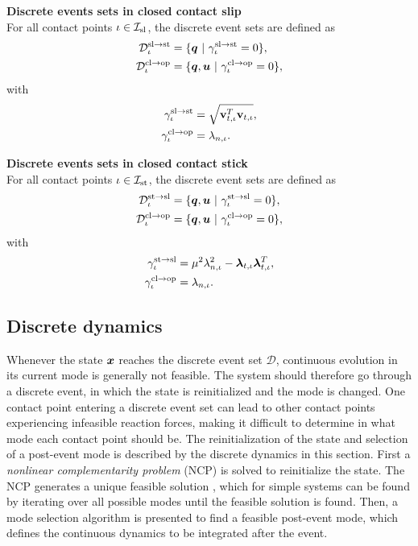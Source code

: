 \documentclass[../DC2019003Bouma.tex]{subfiles}
\begin{document}
\textbf{Discrete events sets in closed contact slip}\\
For all contact points $\iota\in\mathcal{I}_{\text{sl}}$, the discrete event sets are defined as
\begin{align}
\mathcal{D}^{\text{sl}\rightarrow\text{st}}_{\iota} &= \{ \qb\ |\ \gamma^{\text{sl}\rightarrow\text{st}}_{\iota} = 0\},\label{eq:2Dslst}\\
\mathcal{D}^{\text{cl}\rightarrow\text{op}}_{\iota} &= \{ \qb,\ub\ |\ \gamma^{\text{cl}\rightarrow\text{op}}_{\iota} = 0\},\label{eq:2Dslop}
\end{align}
with 
\begin{align}
\gamma^{\text{sl}\rightarrow\text{st}}_{\iota} &= \sqrt{\mathbf{v}_{t,\iota}^T\mathbf{v}_{t,\iota}},\\
\gamma^{\text{cl}\rightarrow\text{op}}_{\iota} &= \lambda_{n,\iota}.
\end{align}

\textbf{Discrete events sets in closed contact stick}\\
For all contact points $\iota\in\mathcal{I}_{\text{st}}$, the discrete event sets are defined as
\begin{align}
\mathcal{D}^{\text{st}\rightarrow\text{sl}}_{\iota} &= \{ \qb,\ub\ |\ \gamma^{\text{st}\rightarrow\text{sl}}_{\iota} = 0 \},\label{eq:2Dstsl}\\
\mathcal{D}^{\text{cl}\rightarrow\text{op}}_{\iota} &= \{ \qb,\ub\ |\ \gamma^{\text{cl}\rightarrow\text{op}}_{\iota} = 0 \},\label{eq:2Dstop}
\end{align}
with 
\begin{align}
\gamma^{\text{st}\rightarrow\text{sl}}_{\iota} &= \mu^2\lambda_{n,\iota}^2-\boldsymbol{\lambda}_{t,\iota}\boldsymbol{\lambda}_{t,\iota}^T,\\
\gamma^{\text{cl}\rightarrow\text{op}}_{\iota} &= \lambda_{n,\iota}.
\end{align}

\subsection{Discrete dynamics}\label{sec:2discdyn}
Whenever the state ${\boldsymbol{x}}$ reaches the discrete event set $\mathcal{D}$, continuous evolution in its current mode is generally not feasible. The system should therefore go through a discrete event, in which the state is reinitialized and the mode is changed. One contact point entering a discrete event set can lead to other contact points experiencing infeasible reaction forces, making it difficult to determine in what mode each contact point should be. The reinitialization of the state and selection of a post-event mode is described by the discrete dynamics in this section. First a \textit{nonlinear complementarity problem} (NCP) is solved to reinitialize the state. The NCP generates a unique feasible solution \cite{Delassus1917}, which for simple systems can be found by iterating over all possible modes until the feasible solution is found. Then, a mode selection algorithm is presented to find a feasible post-event mode, which defines the continuous dynamics to be integrated after the event. 
%
\end{document}
